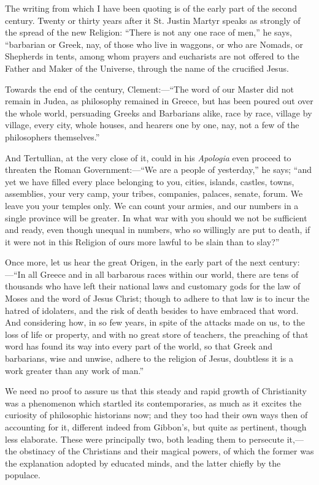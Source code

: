 The writing from which I have been quoting is of the early part of
the second century. Twenty or thirty years after it St. Justin Martyr
speaks as strongly of the spread of the new Religion: ``There is
not any one race of men,'' he says, ``barbarian or Greek, nay,
of those who live in waggons, or who are Nomads, or Shepherds in
tents, among whom prayers and eucharists are not offered to the Father
and Maker of the Universe, through the name of the crucified Jesus.

Towards the end of the century, Clement:—``The word of our
Master did not remain in Judea, as philosophy remained in Greece, but
has been poured out over the whole world, persuading Greeks and
Barbarians alike, race by race, village by village, every city, whole
houses, and hearers one by one, nay, not a few of the philosophers
themselves.''

And Tertullian, at the very close of it, could in his \emph{Apologia}
even proceed to threaten the Roman Government:—``We are a people
of yesterday,'' he says; ``and yet we have filled every place
belonging to you, cities, islands, castles, towns, assemblies, your
very camp, your tribes, companies, palaces, senate, forum. We leave
you your temples only. We can count your armies, and our numbers in a
single province will be greater. In what war with you should we not be
sufficient and ready, even though unequal in numbers, who so willingly
are put to death, if it were not in this Religion of ours more lawful
to be slain than to slay?''

Once more, let us hear the great Origen, in the early part of the
next century:—``In all Greece and in all barbarous races within
our world, there are tens of thousands who have left their national
laws and customary gods for the law of Moses and the word of Jesus
Christ; though to adhere to that law is to incur the hatred of
idolaters, and the risk of death besides to have embraced that word.
And considering how, in so few years, in spite of the attacks made on
us, to the loss of life or property, and with no great store of
teachers, the preaching of that word has found its way into every part
of the world, so that Greek and barbarians, wise and unwise,
adhere to the religion of Jesus, doubtless it is a work greater than
any work of man.''

We need no proof to assure us that this steady and rapid growth of
Christianity was a phenomenon which startled its contemporaries, as
much as it excites the curiosity of philosophic historians now; and
they too had their own ways then of accounting for it, different
indeed from Gibbon's, but quite as pertinent, though less elaborate.
These were principally two, both leading them to persecute it,—the
obstinacy of the Christians and their magical powers, of which the
former was the explanation adopted by educated minds, and the latter
chiefly by the populace.

